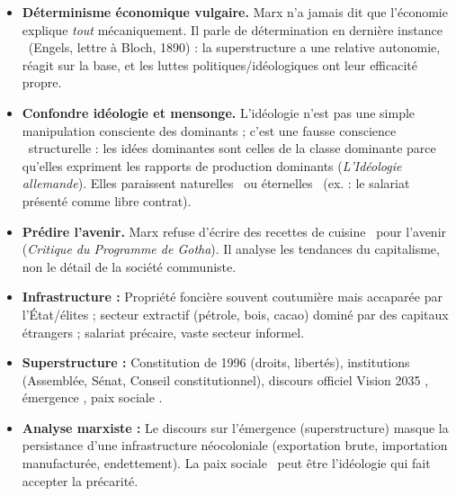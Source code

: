 \documentclass[11pt]{article}
\newcommand{\cle}[1]{{\popxbold\color{popdark}#1}}
\begin{document}
\begin{attention}
\begin{itemize}
\item \textbf{Déterminisme économique vulgaire.} Marx n'a jamais dit que l'économie explique \emph{tout} mécaniquement. Il parle de détermination \guillemotleft en dernière instance \guillemotright\ (Engels, lettre à Bloch, 1890) : la superstructure a une relative autonomie, réagit sur la base, et les luttes politiques/idéologiques ont leur efficacité propre.
\item \textbf{Confondre idéologie et mensonge.} L'\cle{idéologie} n'est pas une simple manipulation consciente des dominants ; c'est une \guillemotleft fausse conscience \guillemotright\ structurelle : les idées dominantes sont celles de la classe dominante parce qu'elles expriment les rapports de production dominants (\emph{L'Idéologie allemande}). Elles paraissent \guillemotleft naturelles \guillemotright\ ou \guillemotleft éternelles \guillemotright\ (ex. : le salariat présenté comme libre contrat).
\item \textbf{Prédire l'avenir.} Marx refuse d'écrire des \guillemotleft recettes de cuisine \guillemotright\ pour l'avenir (\emph{Critique du Programme de Gotha}). Il analyse les tendances du capitalisme, non le détail de la société communiste.
\end{itemize}
\end{attention}

\begin{exemplebox}
\begin{itemize}
\item \textbf{Infrastructure :} Propriété foncière souvent coutumière mais accaparée par l'État/élites ; secteur extractif (pétrole, bois, cacao) dominé par des capitaux étrangers ; salariat précaire, vaste secteur informel.
\item \textbf{Superstructure :} Constitution de 1996 (droits, libertés), institutions (Assemblée, Sénat, Conseil constitutionnel), discours officiel \guillemotleft Vision 2035 \guillemotright, \guillemotleft émergence \guillemotright, \guillemotleft paix sociale \guillemotright.
\item \textbf{Analyse marxiste :} Le discours sur l'émergence (superstructure) masque la persistance d'une infrastructure néocoloniale (exportation brute, importation manufacturée, endettement). La \guillemotleft paix sociale \guillemotright\ peut être l'idéologie qui fait accepter la précarité.
\end{itemize}
\end{exemplebox}
\end{document}
